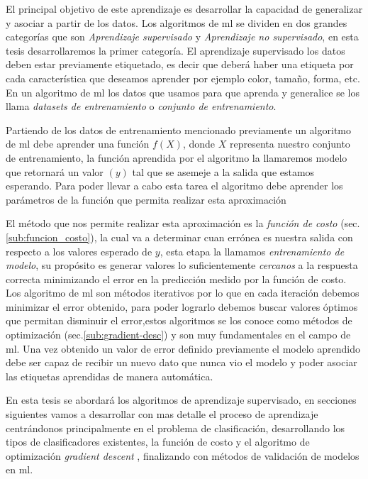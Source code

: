 El principal objetivo de este aprendizaje es desarrollar la capacidad de generalizar y asociar a partir de los datos. Los algoritmos de  \ac{ml} se dividen en dos grandes categorías que son \textit{Aprendizaje supervisado} y \textit{Aprendizaje no supervisado},  en esta tesis desarrollaremos la primer categoría.  El aprendizaje supervisado los datos deben estar previamente etiquetado, es decir que deberá haber una etiqueta por cada característica que deseamos aprender por ejemplo color, tamaño, forma, etc. En un algoritmo de \ac{ml} los datos que usamos para que aprenda y generalice se los llama \textit{datasets de entrenamiento} o \textit{conjunto de entrenamiento}.

Partiendo de los datos de entrenamiento mencionado previamente un algoritmo de \ac{ml} debe aprender una función  $ f(X)$, donde $ X$ representa nuestro conjunto de entrenamiento, la función aprendida por el algoritmo la llamaremos modelo  que retornará un valor $(y)$ tal que se asemeje a la salida que estamos esperando. Para poder llevar a cabo esta tarea el algoritmo debe aprender los parámetros de la función que permita realizar esta aproximación 

El método que nos permite realizar esta aproximación es la \textit{función de costo} (sec.\ref{sub:funcion_costo}), la cual va a  determinar cuan errónea es nuestra salida con respecto a los valores esperado de  $y$, esta etapa la llamamos \textit{entrenamiento de modelo}, su propósito es generar valores lo suficientemente \textit{cercanos} a la respuesta correcta minimizando el error en la predicción medido por la función de costo. Los algoritmo de \ac{ml} son métodos iterativos por lo que en cada iteración debemos minimizar el error obtenido, para poder lograrlo debemos buscar valores óptimos que permitan disminuir el error,estos algoritmos se los conoce como métodos de optimización (sec.\ref{sub:gradient-desc}) y son muy fundamentales en el campo de \ac{ml}. Una vez obtenido un valor de error definido previamente el modelo aprendido debe ser capaz de recibir un nuevo dato que nunca vio el modelo y poder asociar las etiquetas aprendidas de manera automática. 

En esta tesis se abordará los algoritmos de aprendizaje supervisado, en secciones siguientes vamos a desarrollar con mas detalle el proceso de aprendizaje centrándonos principalmente en el problema de clasificación, desarrollando los tipos de clasificadores existentes, la función de costo y el algoritmo de optimización \textit{gradient descent} \citep{cnns}, finalizando con métodos de validación de modelos en \ac{ml}.

